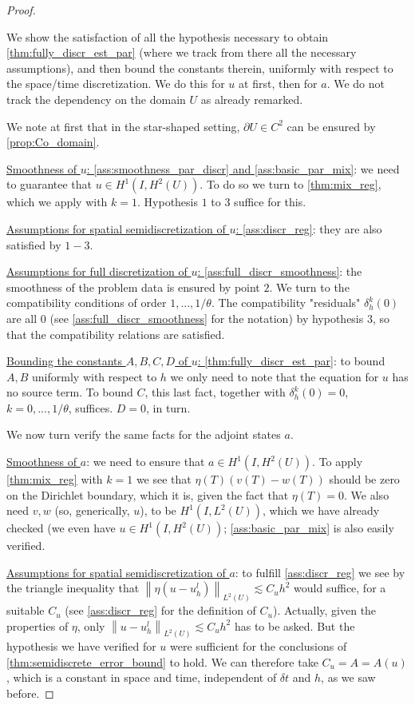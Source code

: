 \documentclass[english,a4paper,9pt,oneside]{scrbook}	%
\theoremstyle{break}
\newenvironment{mproof}[1][\proofname]{%
  \begin{proof}[#1]$ $\par\nobreak\ignorespaces
}{%
  \end{proof}
}
\renewcommand*{\proofname}{Proof}
\theoremstyle{remark}
\newcommand{\norm}[1]{\left\lVert#1\right\rVert}
\begin{document}
\begin{mproof}

We show the satisfaction of all the hypothesis necessary to obtain \cref{thm:fully_discr_est_par} (where we track from there all the necessary assumptions), and then bound the constants therein, uniformly with respect to the space/time discretization. We do this for $u$ at first, then for $a$. We do not track the dependency on the domain $U$ as already remarked.

We note at first that in the star-shaped setting, $\partial U \in C^2$ can be ensured by \cref{prop:Co_domain}.

\underline{Smoothness of $u$: \cref{ass:smoothness_par_discr} and  \cref{ass:basic_par_mix}}: we need to guarantee that $u \in H^1(I,H^2(U))$. To do so we turn to \cref{thm:mix_reg}, which we apply with $k=1$. Hypothesis $1$ to $3$ suffice for this.

\underline{Assumptions for spatial semidiscretization of $u$: \cref{ass:discr_reg}}: they are also satisfied by $1-3$.

\underline{Assumptions for full discretization of $u$: \cref{ass:full_discr_smoothness}}: the smoothness of the problem data is ensured by point $2$. We turn to the compatibility conditions of order $1,...,1/\theta$. The compatibility "residuals" $\delta_h^k(0)$ are all $0$ (see \cref{ass:full_discr_smoothness} for the notation) by hypothesis $3$, so that the compatibility relations are satisfied.

\underline{Bounding the constants $A,B,C,D$ of $u$: \cref{thm:fully_discr_est_par}}: to bound $A,B$ uniformly with respect to $h$ we only need to note that the equation for $u$ has no source term. To bound $C$, this last fact, together with $\delta_h^k(0)=0$, $k=0,...,1/\theta$, suffices. $D=0$, in turn.

We now turn verify the same facts for the adjoint states $a$.

\underline{Smoothness of $a$}: we need to ensure that $a \in H^1(I,H^2(U))$. To apply \cref{thm:mix_reg} with $k=1$ we see that $\eta(T)(v(T)-w(T))$ should be zero on the Dirichlet boundary, which it is, given the fact that $\eta(T)=0$. We also need $v,w$ (so, generically, $u$), to be $H^1(I, L^2(U))$, which we have already checked (we even have $u \in H^1(I,H^2(U))$; \cref{ass:basic_par_mix} is also easily verified.

\underline{Assumptions for spatial semidiscretization of $a$}: to fulfill \cref{ass:discr_reg} we see by the triangle inequality that $\norm{\eta(u-u_h^l)}_{L^2(U)}\lesssim C_u h^2$ would suffice, for a suitable $C_u$ (see \cref{ass:discr_reg} for the definition of $C_u$). Actually, given the properties of $\eta$, only $\norm{u-u_h^l}_{L^2(U)}\lesssim C_u h^2$ has to be asked. But the hypothesis we have verified for $u$ were sufficient for the conclusions of \cref{thm:semidiscrete_error_bound} to hold. We can therefore take $C_u = A = A(u)$, which is a constant in space and time, independent of $\delta t$ and $h$, as we saw before.


\end{mproof}
\end{document}
